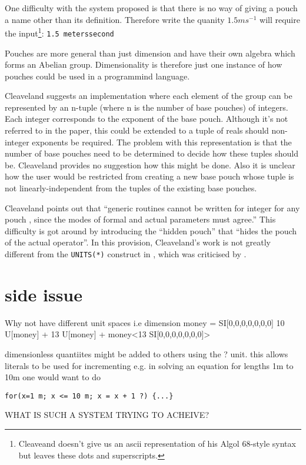 \documentclass[a4paper]{article}
\begin{document}
One difficulty with the system proposed is that there is no way of giving a 
pouch a name other than its definition. Therefore write the quanity 
$1.5ms^{-1}$ will require the input\footnote{Cleaveand doesn't give us an ascii representation of his 
Algol 68-style syntax but leaves these dots and superscripts.}:
\texttt{1.5 meters\textbullet second\raisebox{1ex}{\small -1}}

Pouches are more general than just dimension and have their own algebra which
forms an Abelian group. Dimensionality is therefore just one instance of how 
pouches could be used in a programmind language.

Cleaveland suggests an implementation where each element of the group can 
be represented by an n-tuple (where n is the number of base pouches) of 
integers. Each integer corresponds to the exponent of the base pouch. 
Although it's not referred to in the paper, this could be extended to a 
tuple of reals should non-integer exponents be required. The problem with this
representation is that the number of base pouches need to be determined to 
decide how these tuples should be. Cleaveland provides no suggestion how this 
might be done. Also it is unclear how the user would be restricted from creating
a new base pouch whose tuple is not linearly-independent from the tuples of the
existing base pouches.

Cleaveland points out that ``generic routines cannot be written for integer 
for any pouch , since the modes of formal and actual parameters must agree.''
This difficulty is got around by introducing the ``hidden pouch'' that
``hides the pouch of the actual operator''. In this provision, Cleaveland's
work is not greatly different from the \texttt{UNITS(*)} construct in
 \cite{ME_gehani}, which was criticised by \cite{ME_house}.





\section{side issue}
Why not have different unit spaces
i.e 
dimension money = SI[0,0,0,0,0,0,0]
10 U[money] + 13 U[money] + money<13 SI[0,0,0,0,0,0,0]>

dimensionless quantiites might be added to others using the ? unit. this allows 
literals to be used for incrementing e.g. in solving an equation for lengths 1m 
to 10m one would want to do 

\begin{verbatim}
for(x=1 m; x <= 10 m; x = x + 1 ?) {...}
\end{verbatim}



WHAT IS SUCH A SYSTEM TRYING TO ACHEIVE?




\end{document}
